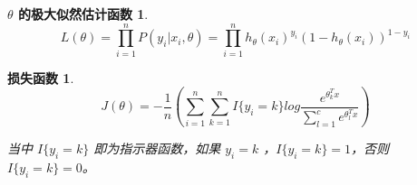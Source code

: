 \newtheorem*{jidasiran}{$\theta$ 的极大似然估计函数}
\begin{jidasiran}
    \begin{equation}
        L\left( \theta \right) = \prod_{i=1}^nP\left( y_i|x_i,\theta \right) = \prod_{i=1}^nh_{\theta}\left( x_i \right)^{y_i}\left(1-h_{\theta}\left(x_i \right) \right)^{1-y_i}
    \end{equation}
\end{jidasiran}

\newtheorem*{sunshihanshu}{损失函数}
\begin{sunshihanshu}
    \begin{equation}
        J\left( \theta \right) = -\frac{1}{n}\left( \sum_{i=1}^n\sum_{k=1}^nI\{ y_i=k\} log\frac{e^{\theta_k^Tx}}{\sum_{l=1}^ce^{\theta_l^Tx}} \right)
    \end{equation}

    当中 $I\{ y_i=k\}$ 即为指示器函数，如果 $y_i=k$ ，$I\{ y_i=k\} =1$，否则 $I\{ y_i=k\} =0$。
\end{sunshihanshu}
